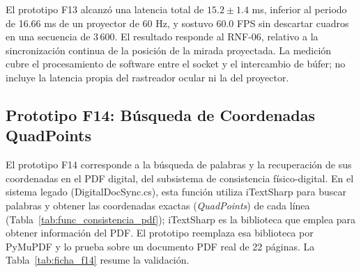 El prototipo F13 alcanzó una latencia total de $15.2 \pm 1.4$ ms, inferior al periodo de 16.66 ms de un proyector de 60 Hz, y sostuvo 60.0 FPS sin descartar cuadros en una secuencia de 3\,600. El resultado responde al RNF-06, relativo a la sincronización continua de la posición de la mirada proyectada. La medición cubre el procesamiento de software entre el socket y el intercambio de búfer; no incluye la latencia propia del rastreador ocular ni la del proyector.
 
\subsection{Prototipo F14: Búsqueda de Coordenadas QuadPoints}
 
El prototipo F14 corresponde a la búsqueda de palabras y la recuperación de sus coordenadas en el PDF digital, del subsistema de consistencia físico-digital. En el sistema legado (DigitalDocSync.cs), esta función utiliza iTextSharp para buscar palabras y obtener las coordenadas exactas (\textit{QuadPoints}) de cada línea (Tabla~\ref{tab:func_consistencia_pdf}); iTextSharp es la biblioteca que \cite{pezoa2020implementacion} emplea para obtener información del PDF. El prototipo reemplaza esa biblioteca por PyMuPDF y lo prueba sobre un documento PDF real de 22 páginas. La Tabla~\ref{tab:ficha_f14} resume la validación.
 

